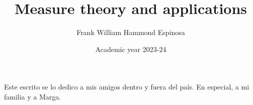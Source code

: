 \documentclass[english,GMAT]{TFGEPSUIB}
\title{Measure theory and applications}
\author{Frank William Hammond Espinosa}
\date{Academic year 2023-24}
\begin{document}
\portada
\portadainterior
\frontmatter

\cleartorecto \thispagestyle{empty}
\begin{agraiments}
Este escrito se lo dedico a mis amigos dentro y fuera del país. En especial, a mi familia y a Marga.
\end{agraiments}

\cleartorecto \tableofcontents


% 

% 

\mainmatter\pagestyle{ruled}








%
\appendix
 





\backmatter



 
\end{document}
